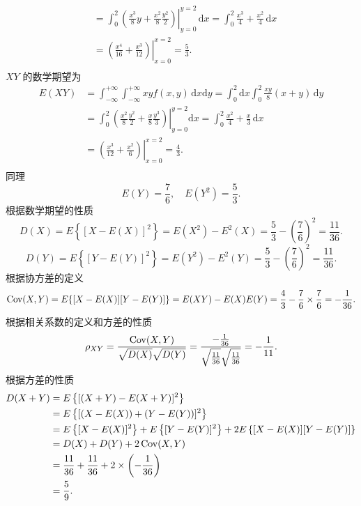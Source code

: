 \begin{solution}
$$\begin{aligned}
             & = \int_0^2 \left.\left(\frac{x^3}{8}y + \frac{x^2}{8}\frac{y^2}{2}\right)\right|_{y=0}^{y=2} \,\mathrm{d}x
            = \int_0^2 \frac{x^3}{4} + \frac{x^2}{4} \,\mathrm{d}x                                                        \\
             & = \left.\left(\frac{x^4}{16} + \frac{x^3}{12}\right)\right|_{x=0}^{x=2}  = \frac{5}{3}.                    \\
        \end{aligned}
    $$
    $XY$ 的数学期望为
    $$
        \begin{aligned}
            E(XY)
             & = \int_{-\infty}^{+\infty}\int_{-\infty}^{+\infty} xyf(x,y) \,\mathrm{d}x\mathrm{d}y = \int_0^2 \mathrm{d}x\int_0^2\frac{xy}{8}(x+y)\,\mathrm{d}y                      \\
             & = \int_0^2 \left.\left(\frac{x^2}{8}\frac{y^2}{2} + \frac{x}{8}\frac{y^3}{3}\right)\right|_{y=0}^{y=2}\mathrm{d}x = \int_0^2 \frac{x^2}{4} + \frac{x}{3} \,\mathrm{d}x \\
             & = \left.\left(\frac{x^3}{12} + \frac{x^2}{6}\right)\right|_{x=0}^{x=2}   = \frac{4}{3}.                                                                                \\
        \end{aligned}
    $$
    同理
    $$
        E(Y) = \frac{7}{6}, \quad E(Y^2) = \frac{5}{3}.
    $$
    根据数学期望的性质
    $$
        D(X)
        = E\left\{[X - E(X)]^2\right\}
        = E(X^2)-E^2(X)
        = \frac{5}{3}-\left(\frac{7}{6}\right)^2
        = \frac{11}{36}.
    $$
    $$
        D(Y)
        = E\left\{[Y - E(Y)]^2\right\}
        = E(Y^2)-E^2(Y)
        = \frac{5}{3}-\left(\frac{7}{6}\right)^2
        = \frac{11}{36}.
    $$
    根据协方差的定义
    $$
        \operatorname{Cov}(X,Y)
        = E\{[X-E(X)][Y-E(Y)]\}
        = E(XY) - E(X)E(Y)
        = \frac{4}{3} - \frac{7}{6} \times \frac{7}{6}
        = -\frac{1}{36}.
    $$
    根据相关系数的定义和方差的性质
    $$
        \rho_{XY}
        = \frac{\operatorname{Cov}(X,Y)}{\sqrt{D(X)}\sqrt{D(Y)}}
        = \frac{-\frac{1}{36}}{\sqrt{\frac{11}{36}}\sqrt{\frac{11}{36}}}
        = -\frac{1}{11}.
    $$
    根据方差的性质
    $$
        \begin{aligned}
            D(X+Y)
             & = E\left\{[(X+Y) - E(X+Y)]^2\right\}                                                          \\
             & = E\left\{[(X-E(X)) + (Y-E(Y))]^2\right\}                                                     \\
             & = E\left\{[X-E(X)]^2\right\} + E\left\{[Y-E(Y)]^2\right\} + 2E\left\{[X-E(X)][Y-E(Y)]\right\} \\
             & = D(X) + D(Y) + 2\operatorname{Cov}(X,Y)                                                                    \\
             & = \frac{11}{36} + \frac{11}{36} + 2 \times \left(-\frac{1}{36}\right)                         \\
             & = \frac{5}{9}.
        \end{aligned}
    $$
\end{solution}



